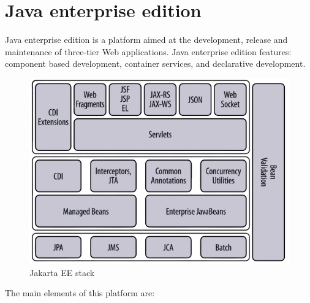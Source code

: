 \documentclass[12pt, a4paper]{report}
\newtheorem[style=M,bodystyle=\normalfont]{theorem}{Theorem}
\newtheorem[style=M,bodystyle=\normalfont]{corollary}{Corollary}
\newtheorem[style=M,bodystyle=\normalfont]{lemma}{Lemma}
\newtheorem[style=M,bodystyle=\normalfont]{definition}{Definition}
\begin{document}
    \section{Java enterprise edition}
    Java enterprise edition is a platform aimed at the development, release and maintenance of three-tier Web applications.     Java enterprise edition features: 
    component based development, container services, and declarative development.
    \begin{figure}[H]
        \centering
        \includegraphics[width=0.5\linewidth]{images/jee.png}
        \caption{Jakarta EE stack}
    \end{figure}
    The main elements of this platform are: 
\end{document}
